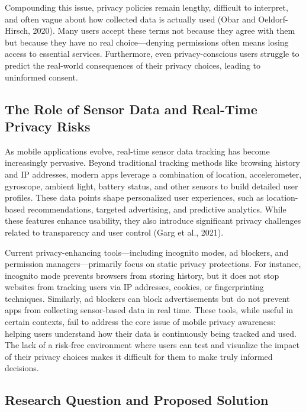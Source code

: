\documentclass[acmlarge, nonacm]{acmart}
\begin{document}
Compounding this issue, privacy policies remain lengthy, difficult to interpret, and often vague about how collected data is actually used (Obar and Oeldorf-Hirsch, 2020). Many users accept these terms not because they agree with them but because they have no real choice—denying permissions often means losing access to essential services. Furthermore, even privacy-conscious users struggle to predict the real-world consequences of their privacy choices, leading to uninformed consent.

\subsection{The Role of Sensor Data and Real-Time Privacy Risks}

As mobile applications evolve, real-time sensor data tracking has become increasingly pervasive. Beyond traditional tracking methods like browsing history and IP addresses, modern apps leverage a combination of location, accelerometer, gyroscope, ambient light, battery status, and other sensors to build detailed user profiles. These data points shape personalized user experiences, such as location-based recommendations, targeted advertising, and predictive analytics. While these features enhance usability, they also introduce significant privacy challenges related to transparency and user control (Garg et al., 2021).

Current privacy-enhancing tools—including incognito modes, ad blockers, and permission managers—primarily focus on static privacy protections. For instance, incognito mode prevents browsers from storing history, but it does not stop websites from tracking users via IP addresses, cookies, or fingerprinting techniques. Similarly, ad blockers can block advertisements but do not prevent apps from collecting sensor-based data in real time. These tools, while useful in certain contexts, fail to address the core issue of mobile privacy awareness: helping users understand how their data is continuously being tracked and used. The lack of a risk-free environment where users can test and visualize the impact of their privacy choices makes it difficult for them to make truly informed decisions.

\subsection{Research Question and Proposed Solution}
\end{document}
